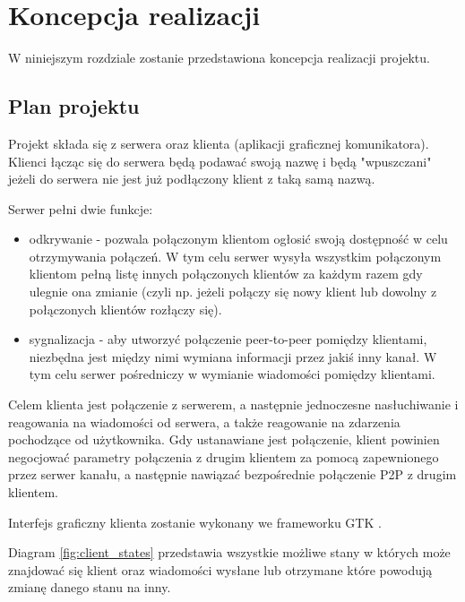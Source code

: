 \chapter{Koncepcja realizacji}

W niniejszym rozdziale zostanie przedstawiona koncepcja realizacji projektu.

\section{Plan projektu}

Projekt składa się z serwera oraz klienta (aplikacji graficznej komunikatora). Klienci łącząc
się do serwera będą podawać swoją nazwę i będą "wpuszczani" jeżeli do serwera nie jest już
podłączony klient z taką samą nazwą.

Serwer pełni dwie funkcje:

\begin{itemize}
    \item odkrywanie - pozwala połączonym klientom ogłosić swoją dostępność w celu otrzymywania
          połączeń. W tym celu serwer wysyła wszystkim połączonym klientom pełną listę innych
          połączonych klientów za każdym razem gdy ulegnie ona zmianie (czyli np. jeżeli połączy
          się nowy klient lub dowolny z połączonych klientów rozłączy się).
    \item sygnalizacja - aby utworzyć połączenie peer-to-peer pomiędzy klientami, niezbędna jest
          między nimi wymiana informacji przez jakiś inny kanał. W tym celu serwer pośredniczy w
          wymianie wiadomości pomiędzy klientami.
\end{itemize}

Celem klienta jest połączenie z serwerem, a następnie jednoczesne nasłuchiwanie i reagowania na
wiadomości od serwera, a także reagowanie na zdarzenia pochodzące od użytkownika. Gdy ustanawiane
jest połączenie, klient powinien negocjować parametry połączenia z drugim klientem za pomocą
zapewnionego przez serwer kanału, a następnie nawiązać bezpośrednie połączenie P2P z drugim
klientem.

Interfejs graficzny klienta zostanie wykonany we frameworku GTK \cite{gui_rust_gtk}.

Diagram \ref{fig:client_states} przedstawia wszystkie możliwe stany w których może znajdować się
klient oraz wiadomości wysłane lub otrzymane które powodują zmianę danego stanu na inny.

